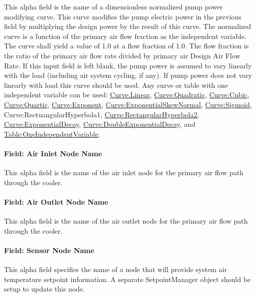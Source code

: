 This alpha field is the name of a dimensionless normalized pump power modifying curve. This curve modifies the pump electric power in the previous field by multiplying the design power by the result of this curve. The normalized curve is a function of the primary air flow fraction as the independent variable. The curve shall yield a value of 1.0 at a flow fraction of 1.0. The flow fraction is the ratio of the primary air flow rate divided by primary air Design Air Flow Rate. If this input field is left blank, the pump power is assumed to vary linearly with the load (including air system cycling, if any). If pump power does not vary linearly with load this curve should be used. Any curve or table with one independent variable can be used: \hyperref[curvelinear]{Curve:Linear}, \hyperref[curvequadratic]{Curve:Quadratic}, \hyperref[curvecubic]{Curve:Cubic}, \hyperref[curvequartic]{Curve:Quartic}, \hyperref[curveexponent]{Curve:Exponent}, \hyperref[curveexponentialskewnormal]{Curve:ExponentialSkewNormal}, \hyperref[curvesigmoid]{Curve:Sigmoid}, Curve:RectuangularHyperbola1, \hyperref[curverectangularhyperbola2]{Curve:RectangularHyperbola2}, \hyperref[curveexponentialdecay]{Curve:ExponentialDecay}, \hyperref[curvedoubleexponentialdecay]{Curve:DoubleExponentialDecay}, and \hyperref[tableoneindependentvariable]{Table:OneIndependentVariable}.

\paragraph{Field: Air Inlet Node Name}\label{field-air-inlet-node-name-1-001}

This alpha field is the name of the air inlet node for the primary air flow path through the cooler.

\paragraph{Field: Air Outlet Node Name}\label{field-air-outlet-node-name-1-000}

This alpha field is the name of the air outlet node for the primary air flow path through the cooler.

\paragraph{Field: Sensor Node Name}\label{field-sensor-node-name-001}

This alpha field specifies the name of a node that will provide system air temperature setpoint information. A separate SetpointManager object should be setup to update this node.

